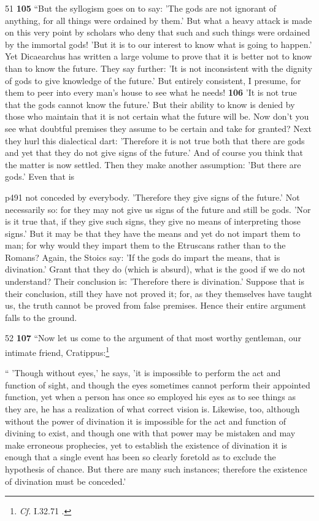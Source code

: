 51
\textbf{105} ``But the syllogism goes on to say: 'The gods are not ignorant of anything, for all things were ordained by them.' But what a heavy attack is made on this very point by scholars who deny that such and such things were ordained by the immortal gods! 'But it is to our interest to know what is going to happen.' Yet Dicaearchus has written a large volume to prove that it is better not to know than to know the future. They say further: 'It is not inconsistent with the dignity of gods to give knowledge of the future.' But entirely consistent, I presume, for them to peer into every man's house to see what he needs! \textbf{106} 'It is not true that the gods cannot know the future.' But their ability to know is denied by those who maintain that it is not certain what the future will be. Now don't you see what doubtful premises they assume to be certain and take for granted? Next they hurl this dialectical dart: 'Therefore it is not true both that there are gods and yet that they do not give signs of the future.' And of course you think that the matter is now settled. Then they make another assumption: 'But there are gods.' Even that is

p491 not conceded by everybody. 'Therefore they give signs of the future.' Not necessarily so: for they may not give us signs of the future and still be gods. 'Nor is it true that, if they give such signs, they give no means of interpreting those signs.' But it may be that they have the means and yet do not impart them to man; for why would they impart them to the Etruscans rather than to the Romans? Again, the Stoics say: 'If the gods do impart the means, that is divination.' Grant that they do (which is absurd), what is the good if we do not understand? Their conclusion is: 'Therefore there is divination.' Suppose that is their conclusion, still they have not proved it; for, as they themselves have taught us, the truth cannot be proved from false premises. Hence their entire argument falls to the ground.

52
\textbf{107} ``Now let us come to the argument of that most worthy gentleman, our intimate friend, Cratippus:\footnote{\emph{Cf.}
I.32.71 .

}

`` 'Though without eyes,' he says, 'it is impossible to perform the act and function of sight, and though the eyes sometimes cannot perform their appointed function, yet when a person has once so employed his eyes as to see things as they are, he has a realization of what correct vision is. Likewise, too, although without the power of divination it is impossible for the act and function of divining to exist, and though one with that power may be mistaken and may make erroneous prophecies, yet to establish the existence of divination it is enough that a single event has been so clearly foretold as to exclude the hypothesis of chance. But there are many such instances; therefore the existence of divination must be conceded.'

